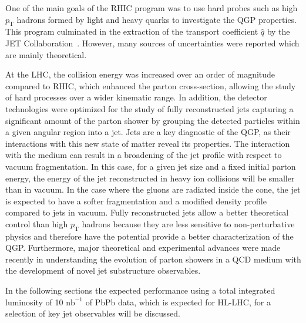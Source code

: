

One of the main goals of the RHIC program was to use hard probes such as high $p_{\mathrm{T}}$ hadrons formed by light and heavy quarks to investigate the QGP properties. This program culminated in the extraction of the transport coefficient $\hat q $ by the JET Collaboration~\cite{Burke:2013yra}. However, many sources of uncertainties were reported which are mainly theoretical. 

At the LHC, the collision energy was increased over an order of magnitude compared to RHIC, which enhanced the parton cross-section, allowing the study of hard processes over a wider kinematic range. In addition, the detector technologies were optimized for the study of fully reconstructed jets capturing a significant amount of the parton shower by grouping the detected particles within a given angular region into a jet. Jets are a key diagnostic of the QGP, as their interactions with this new state of matter reveal its properties. The interaction with the medium can result in a broadening of the jet profile with respect to vacuum fragmentation. In this case, for a given jet size and a fixed initial parton energy, the energy of the jet reconstructed in heavy ion collisions will be smaller than in vacuum. In the case where the gluons are radiated inside the cone, the jet is expected to have a softer fragmentation and a modified density profile compared to jets in vacuum. 
Fully reconstructed jets allow a better theoretical control than high $p_{\mathrm{T}}$ hadrons because they are less sensitive to non-perturbative physics and therefore have the potential provide a better characterization of the QGP. Furthermore, major theoretical and experimental advances were made recently in understanding the evolution of parton showers in a QCD medium with the development of novel jet substructure observables.

In the following sections the expected performance using a total integrated luminosity of 10 $\mathrm{nb}^{-1}$ of PbPb data, which is expected for HL-LHC, for a selection of key jet observables will be discussed. %
